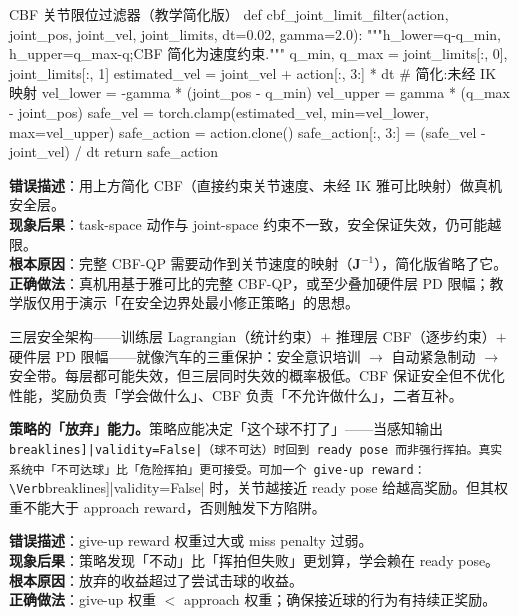 \begin{codebox}[Python]{CBF 关节限位过滤器（教学简化版）}
def cbf_joint_limit_filter(action, joint_pos, joint_vel, joint_limits,
                           dt=0.02, gamma=2.0):
    """h_lower=q-q_min, h_upper=q_max-q;CBF 简化为速度约束."""
    q_min, q_max = joint_limits[:, 0], joint_limits[:, 1]
    estimated_vel = joint_vel + action[:, 3:] * dt           # 简化:未经 IK 映射
    vel_lower = -gamma * (joint_pos - q_min)
    vel_upper = gamma * (q_max - joint_pos)
    safe_vel = torch.clamp(estimated_vel, min=vel_lower, max=vel_upper)
    safe_action = action.clone()
    safe_action[:, 3:] = (safe_vel - joint_vel) / dt
    return safe_action
\end{codebox}

\begin{pitfall}
\textbf{错误描述}：用上方简化 CBF（直接约束关节速度、未经 IK 雅可比映射）做真机安全层。\\
\textbf{现象后果}：task-space 动作与 joint-space 约束不一致，安全保证失效，仍可能越限。\\
\textbf{根本原因}：完整 CBF-QP 需要动作到关节速度的映射（$\mathbf{J}^{-1}$），简化版省略了它。\\
\textbf{正确做法}：真机用基于雅可比的完整 CBF-QP，或至少叠加硬件层 PD 限幅；教学版仅用于演示「在安全边界处最小修正策略」的思想。
\end{pitfall}

\begin{insight}\label{ins:rlmc-strike-three-layer-safety}
三层安全架构——训练层 Lagrangian（统计约束）$+$ 推理层 CBF（逐步约束）$+$ 硬件层 PD 限幅——就像汽车的三重保护：安全意识培训 $\to$ 自动紧急制动 $\to$ 安全带。每层都可能失效，但三层同时失效的概率极低。CBF 保证安全但不优化性能，奖励负责「学会做什么」、CBF 负责「不允许做什么」，二者互补。
\end{insight}

\textbf{策略的「放弃」能力。}策略应能决定「这个球不打了」——当感知输出 \Verb[breaklines]|validity=False|（球不可达）时回到 ready pose 而非强行挥拍。真实系统中「不可达球」比「危险挥拍」更可接受。可加一个 give-up reward：\Verb[breaklines]|validity=False| 时，关节越接近 ready pose 给越高奖励。但其权重不能大于 approach reward，否则触发下方陷阱。

\begin{pitfall}
\textbf{错误描述}：give-up reward 权重过大或 miss penalty 过弱。\\
\textbf{现象后果}：策略发现「不动」比「挥拍但失败」更划算，学会赖在 ready pose。\\
\textbf{根本原因}：放弃的收益超过了尝试击球的收益。\\
\textbf{正确做法}：give-up 权重 $<$ approach 权重；确保接近球的行为有持续正奖励。
\end{pitfall}

